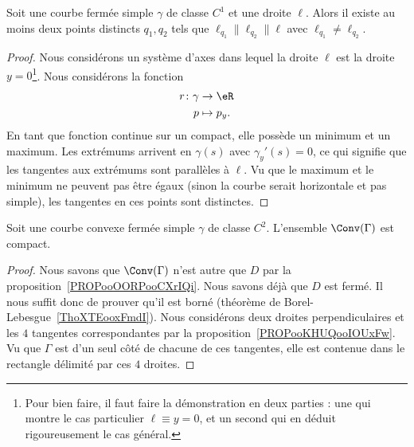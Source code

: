 \begin{proposition}     \label{PROPooKHUQooIOUxFw}
	Soit une courbe fermée simple \( \gamma\) de classe \( C^1\) et une droite \( \ell\). Alors il existe au moins deux points distincts \( q_1,q_2\) tels que \( \ell_{q_1}\parallel \ell_{q_2}\parallel\ell\) avec \( \ell_{q_1}\neq \ell_{q_2}\).
\end{proposition}

\begin{proof}
	Nous considérons un système d'axes dans lequel la droite \( \ell\) est la droite \( y=0\)\footnote{Pour bien faire, il faut faire la démonstration en deux parties : une qui montre le cas particulier \( \ell\equiv y=0\), et un second qui en déduit rigoureusement le cas général.}. Nous considérons la fonction
	\begin{equation}
		\begin{aligned}
			r\colon \gamma & \to \eR      \\
			p              & \mapsto p_y.
		\end{aligned}
	\end{equation}
	En tant que fonction continue sur un compact, elle possède un minimum et un maximum. Les extrémums arrivent en \( \gamma(s)\) avec \( \gamma_y'(s)=0\), ce qui signifie que les tangentes aux extrémums sont parallèles à \( \ell\). Vu que le maximum et le minimum ne peuvent pas être égaux (sinon la courbe serait horizontale et pas simple), les tangentes en ces points sont distinctes.
\end{proof}

\begin{corollary}
	Soit une courbe convexe fermée simple \( \gamma\) de classe \( C^2\). L'ensemble \( \Conv(\Gamma)\) est compact.
\end{corollary}

\begin{proof}
	Nous savons que \( \Conv(\Gamma)\) n'est autre que \( D\) par la proposition~\ref{PROPooOORPooCXrIQi}. Nous savons déjà que \( D\) est fermé. Il nous suffit donc de prouver qu'il est borné (théorème de Borel-Lebesgue~\ref{ThoXTEooxFmdI}). Nous considérons deux droites perpendiculaires et les \( 4\) tangentes correspondantes par la proposition~\ref{PROPooKHUQooIOUxFw}. Vu que \( \Gamma\) est d'un seul côté de chacune de ces tangentes, elle est contenue dans le rectangle délimité par ces \( 4\) droites.
\end{proof}

